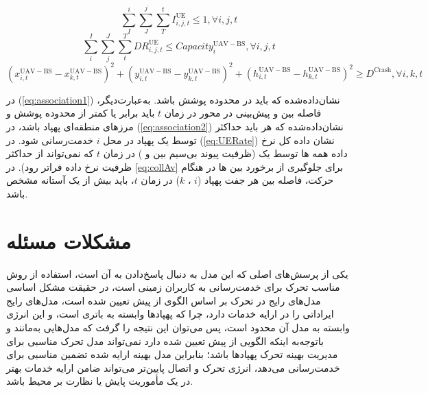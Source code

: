 \begin{equation}
	\label{eq:association2}
	\sum_{I}^{i} \sum_{J}^{j}\sum_{T}^{t} I_{{i,j,t}}^{\mathrm{UE}}\leq 1,  \forall i,j,t
\end{equation}
\begin{equation}
	\label{eq:UERate}
	\sum_{i}^{I} \sum_{j}^{J}\sum_{t}^{T} DR_{i,j,t}^{\mathrm{UE}}\leq Capacity_{i}^ \mathrm{{UAV-BS}}, \forall i,j,t
\end{equation}
\begin{equation}
	\label{eq:collAv}
	\left ( x_{i,t}^ \mathrm{{UAV-BS}} - x_{k,t}^ \mathrm{UAV-BS}\right )^{2} + \left ( y_{i,t}^ \mathrm{ \mathrm{{UAV-BS}}} - y_{k,t}^ \mathrm{ \mathrm{{UAV-BS}}}\right )^{2} +  \left ( h_{i,t}^ \mathrm{ \mathrm{{UAV-BS}}} - h_{k,t}^ \mathrm{ \mathrm{{UAV-BS}}}\right )^{2}\geq D^{\mathrm{Crash}}, \forall i,k,t
\end{equation}

در (\autoref{eq:association1}) نشان‌داده‌شده که  باید در محدوده پوشش  باشد. به‌عبارت‌دیگر، فاصله  بین  و پیش‌بینی  در محور  در زمان $t$ باید برابر یا کمتر از محدوده پوشش و مرزهای منطقه‌ای پهپاد باشد، در (\autoref{eq:association2}) نشان‌داده‌شده که هر  باید حداکثر توسط یک پهپاد در محل $i$ خدمت‌رسانی شود.
در (\autoref{eq:UERate}) نشان داده کل نرخ داده همه ها توسط یک  (ظرفیت پیوند بی‌سیم بین  و ) در زمان $t$ که نمی‌تواند از حداکثر ظرفیت نرخ داده  فراتر رود). در \autoref{eq:collAv} برای جلوگیری از برخورد بین ها در هنگام حرکت، فاصله بین هر جفت پهپاد ($i$ ، $k$) در زمان $t$، باید بیش از یک آستانه مشخص باشد.

\section{مشکلات مسئله}
یکی از پرسش‌های اصلی که این مدل به دنبال پاسخ‌دادن به آن است، استفاده از روش مناسب تحرک برای خدمت‌رسانی به کاربران زمینی است، در حقیقت مشکل اساسی مدل‌های رایج در تحرک بر اساس الگوی از پیش تعیین شده است، مدل‌های رایج ایراداتی را در ارایه خدمات دارد، چرا که پهپادها وابسته به باتری است، و این انرژی وابسته به مدل آن محدود است، پس می‌توان این نتیجه را گرفت که مدل‌هایی به‌مانند  و  باتوجه‌به اینکه الگویی از پیش تعیین شده دارد نمی‌تواند مدل تحرک مناسبی برای مدیریت بهینه تحرک پهپادها باشد؛ بنابراین مدل بهینه ارایه شده تضمین مناسبی برای خدمت‌رسانی می‌دهد، انرژی تحرک و اتصال پایین‌تر می‌تواند ضامن ارایه خدمات بهتر در یک مأموریت پایش یا نظارت بر محیط باشد.

